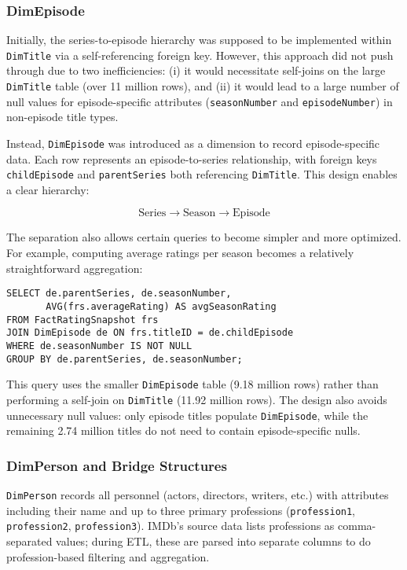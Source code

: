 \subsubsection{DimEpisode}

Initially, the series-to-episode hierarchy was supposed to be implemented within \texttt{DimTitle} via a self-referencing foreign key. However, this approach did not push through due to two inefficiencies: (i) it would necessitate self-joins on the large \texttt{DimTitle} table (over 11 million rows), and (ii) it would lead to a large number of null values for episode-specific attributes (\texttt{seasonNumber} and \texttt{episodeNumber}) in non-episode title types.

Instead, \texttt{DimEpisode} was introduced as a dimension to record episode-specific data. Each row represents an episode-to-series relationship, with foreign keys \texttt{childEpisode} and \texttt{parentSeries} both referencing \texttt{DimTitle}. This design enables a clear hierarchy:

\[
\text{Series} \rightarrow \text{Season} \rightarrow \text{Episode}
\]

The separation also allows certain queries to become simpler and more optimized. For example, computing average ratings per season becomes a relatively straightforward aggregation:

\begin{verbatim}
SELECT de.parentSeries, de.seasonNumber, 
       AVG(frs.averageRating) AS avgSeasonRating
FROM FactRatingSnapshot frs
JOIN DimEpisode de ON frs.titleID = de.childEpisode
WHERE de.seasonNumber IS NOT NULL
GROUP BY de.parentSeries, de.seasonNumber;
\end{verbatim}

This query uses the smaller \texttt{DimEpisode} table (9.18 million rows) rather than performing a self-join on \texttt{DimTitle} (11.92 million rows). The design also avoids unnecessary null values: only episode titles populate \texttt{DimEpisode}, while the remaining 2.74 million titles do not need to contain episode-specific nulls.

\subsubsection{DimPerson and Bridge Structures}

\texttt{DimPerson} records all personnel (actors, directors, writers, etc.) with attributes including their name and up to three primary professions (\texttt{profession1}, \texttt{profession2}, \texttt{profession3}). IMDb's source data lists professions as comma-separated values; during ETL, these are parsed into separate columns to do profession-based filtering and aggregation.

